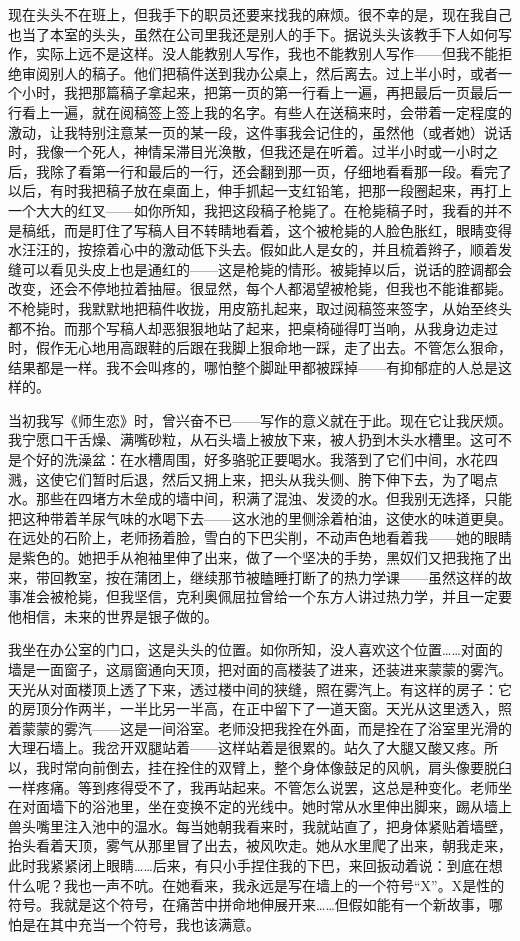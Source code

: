 现在头头不在班上，但我手下的职员还要来找我的麻烦。很不幸的是，现在我自己也当了本室的头头，虽然在公司里我还是别人的手下。据说头头该教手下人如何写作，实际上远不是这样。没人能教别人写作，我也不能教别人写作——但我不能拒绝审阅别人的稿子。他们把稿件送到我办公桌上，然后离去。过上半小时，或者一个小时，我把那篇稿子拿起来，把第一页的第一行看上一遍，再把最后一页最后一行看上一遍，就在阅稿签上签上我的名字。有些人在送稿来时，会带着一定程度的激动，让我特别注意某一页的某一段，这件事我会记住的，虽然他（或者她）说话时，我像一个死人，神情呆滞目光涣散，但我还是在听着。过半小时或一小时之后，我除了看第一行和最后的一行，还会翻到那一页，仔细地看看那一段。看完了以后，有时我把稿子放在桌面上，伸手抓起一支红铅笔，把那一段圈起来，再打上一个大大的红叉——如你所知，我把这段稿子枪毙了。在枪毙稿子时，我看的并不是稿纸，而是盯住了写稿人目不转睛地看着，这个被枪毙的人脸色胀红，眼睛变得水汪汪的，按捺着心中的激动低下头去。假如此人是女的，并且梳着辫子，顺着发缝可以看见头皮上也是通红的——这是枪毙的情形。被毙掉以后，说话的腔调都会改变，还会不停地拉着抽屉。很显然，每个人都渴望被枪毙，但我也不能谁都毙。不枪毙时，我默默地把稿件收拢，用皮筋扎起来，取过阅稿签来签字，从始至终头都不抬。而那个写稿人却恶狠狠地站了起来，把桌椅碰得叮当响，从我身边走过时，假作无心地用高跟鞋的后跟在我脚上狠命地一踩，走了出去。不管怎么狠命，结果都是一样。我不会叫疼的，哪怕整个脚趾甲都被踩掉——有抑郁症的人总是这样的。 

当初我写《师生恋》时，曾兴奋不已——写作的意义就在于此。现在它让我厌烦。我宁愿口干舌燥、满嘴砂粒，从石头墙上被放下来，被人扔到木头水槽里。这可不是个好的洗澡盆：在水槽周围，好多骆驼正要喝水。我落到了它们中间，水花四溅，这使它们暂时后退，然后又拥上来，把头从我头侧、胯下伸下去，为了喝点水。那些在四堵方木垒成的墙中间，积满了混浊、发烫的水。但我别无选择，只能把这种带着羊尿气味的水喝下去——这水池的里侧涂着柏油，这使水的味道更臭。在远处的石阶上，老师扬着脸，雪白的下巴尖削，不动声色地看着我——她的眼睛是紫色的。她把手从袍袖里伸了出来，做了一个坚决的手势，黑奴们又把我拖了出来，带回教室，按在蒲团上，继续那节被瞌睡打断了的热力学课——虽然这样的故事准会被枪毙，但我坚信，克利奥佩屈拉曾给一个东方人讲过热力学，并且一定要他相信，未来的世界是银子做的。 

我坐在办公室的门口，这是头头的位置。如你所知，没人喜欢这个位置……对面的墙是一面窗子，这扇窗通向天顶，把对面的高楼装了进来，还装进来蒙蒙的雾汽。天光从对面楼顶上透了下来，透过楼中间的狭缝，照在雾汽上。有这样的房子：它的房顶分作两半，一半比另一半高，在正中留下了一道天窗。天光从这里透入，照着蒙蒙的雾汽——这是一间浴室。老师没把我拴在外面，而是拴在了浴室里光滑的大理石墙上。我岔开双腿站着——这样站着是很累的。站久了大腿又酸又疼。所以，我时常向前倒去，挂在拴住的双臂上，整个身体像鼓足的风帆，肩头像要脱臼一样疼痛。等到疼得受不了，我再站起来。不管怎么说罢，这总是种变化。老师坐在对面墙下的浴池里，坐在变换不定的光线中。她时常从水里伸出脚来，踢从墙上兽头嘴里注入池中的温水。每当她朝我看来时，我就站直了，把身体紧贴着墙壁，抬头看着天顶，雾气从那里冒了出去，被风吹走。她从水里爬了出来，朝我走来，此时我紧紧闭上眼睛……后来，有只小手捏住我的下巴，来回扳动着说：到底在想什么呢？我也一声不吭。在她看来，我永远是写在墙上的一个符号“X”。X是性的符号。我就是这个符号，在痛苦中拼命地伸展开来……但假如能有一个新故事，哪怕是在其中充当一个符号，我也该满意。 

